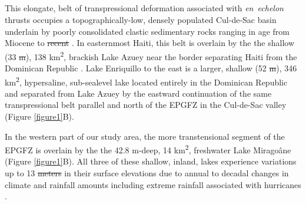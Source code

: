 \documentclass[linenumbers,draft]{agujournal}
\providecommand{\DIFadd}[1]{{\protect\color{blue}\uwave{#1}}} %
\providecommand{\DIFdel}[1]{{\protect\color{red}\sout{#1}}}                      %
\providecommand{\DIFaddbegin}{} %
\providecommand{\DIFaddend}{} %
\providecommand{\DIFdelbegin}{} %
\providecommand{\DIFdelend}{} %
\begin{document}
\DIFdelend \DIFaddbegin \subsection{\DIFadd{Study area}}
\DIFaddend This elongate, belt of transpressional deformation associated with \textit{en~echelon} thrusts occupies a topographically-low, densely populated Cul-de-Sac basin underlain by poorly consolidated clastic sedimentary rocks ranging in age from Miocene to \DIFdelbegin \DIFdel{recent }\DIFdelend \DIFaddbegin \DIFadd{Recent }\DIFaddend \citep{massoni1955haiti,mann1995actively,terrier2014revision,saint2015seismotectonics}. In easternmost Haiti, this belt is overlain by the the shallow (33 \DIFdelbegin \DIFdel{m}\DIFdelend \DIFaddbegin \DIFadd{m-deep}\DIFaddend ), 138 km\textsuperscript{2}, brackish Lake Azuey near the border separating Haiti from the Dominican Republic \citep{wright2015factors,piasecki2016bathymetric}. Lake Enriquillo to the east is a larger, shallow (52 \DIFdelbegin \DIFdel{m}\DIFdelend \DIFaddbegin \DIFadd{m-deep}\DIFaddend ), 346 km\textsuperscript{2}, hypersaline, sub-sealevel lake located entirely in the Dominican Republic and separated from Lake Azuey by the eastward continuation of the same transpressional belt parallel and north of the EPGFZ in the Cul-de-Sac valley \citep{mann1995actively} (Figure \ref{figure1}B). 

In the western part of our study area, the more transtensional segment of the EPGFZ is overlain by the the 42.8 m-deep, 14 km\textsuperscript{2}, freshwater Lake Mirago\^ane (Figure \ref{figure1}B). All three of these shallow, inland, lakes experience variations up to 13 \DIFdelbegin \DIFdel{meters }\DIFdelend \DIFaddbegin \DIFadd{m }\DIFaddend in their surface elevations due to annual to decadal changes in climate and rainfall amounts including extreme rainfall associated with hurricanes \citep{wright2015factors,piasecki2016bathymetric,moknatian2017development,rico2017hydrodynamic}.  
\end{document}
